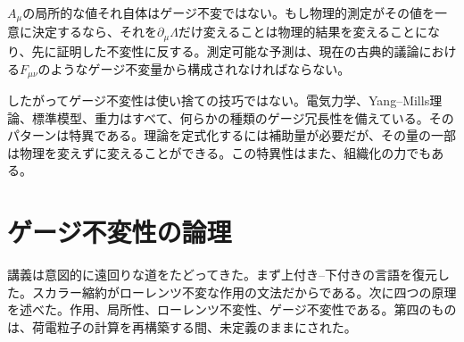 \(A_\mu\)の局所的な値それ自体はゲージ不変ではない。もし物理的測定がその値を一意に決定するなら、それを\(\partial_\mu\Lambda\)だけ変えることは物理的結果を変えることになり、先に証明した不変性に反する。測定可能な予測は、現在の古典的議論における\(F_{\mu\nu}\)のようなゲージ不変量から構成されなければならない。

\begin{classroomqa}
\end{classroomqa}

\begin{classroomqa}
\end{classroomqa}

\begin{classroomqa}
\end{classroomqa}

したがってゲージ不変性は使い捨ての技巧ではない。電気力学、Yang--Mills理論、標準模型、重力はすべて、何らかの種類のゲージ冗長性を備えている。そのパターンは特異である。理論を定式化するには補助量が必要だが、その量の一部は物理を変えずに変えることができる。この特異性はまた、組織化の力でもある。

\section{ゲージ不変性の論理}

講義は意図的に遠回りな道をたどってきた。まず上付き--下付きの言語を復元した。スカラー縮約がローレンツ不変な作用の文法だからである。次に四つの原理を述べた。作用、局所性、ローレンツ不変性、ゲージ不変性である。第四のものは、荷電粒子の計算を再構築する間、未定義のままにされた。


